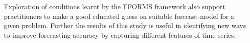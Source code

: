 \documentclass[11pt,a4paper,]{article}
\begin{document}
Exploration of conditions learnt by the FFORMS framework also support practitioners to make a good educated guess on suitable forecast-model for a given problem. Further the results of this study is useful in identifying new ways to improve forecasting accuracy by capturing different features of time series.

\printbibliography[title=References]
\end{document}
